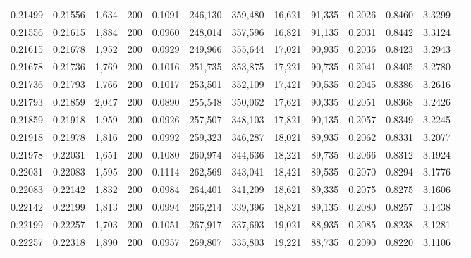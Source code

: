 \begin{tabular}{rrrrrrrrrrrrr}
0.21499 & 0.21556 & 1,634 & 200 &                                     0.1091 & 246,130 & 359,480 &  16,621 &  91,335 & 0.2026 & 0.8460 & 3.3299 \\
0.21556 & 0.21615 & 1,884 & 200 &                                     0.0960 & 248,014 & 357,596 &  16,821 &  91,135 & 0.2031 & 0.8442 & 3.3124 \\
0.21615 & 0.21678 & 1,952 & 200 &                                     0.0929 & 249,966 & 355,644 &  17,021 &  90,935 & 0.2036 & 0.8423 & 3.2943 \\
0.21678 & 0.21736 & 1,769 & 200 &                                     0.1016 & 251,735 & 353,875 &  17,221 &  90,735 & 0.2041 & 0.8405 & 3.2780 \\
0.21736 & 0.21793 & 1,766 & 200 &                                     0.1017 & 253,501 & 352,109 &  17,421 &  90,535 & 0.2045 & 0.8386 & 3.2616 \\
0.21793 & 0.21859 & 2,047 & 200 &                                     0.0890 & 255,548 & 350,062 &  17,621 &  90,335 & 0.2051 & 0.8368 & 3.2426 \\
0.21859 & 0.21918 & 1,959 & 200 &                                     0.0926 & 257,507 & 348,103 &  17,821 &  90,135 & 0.2057 & 0.8349 & 3.2245 \\
0.21918 & 0.21978 & 1,816 & 200 &                                     0.0992 & 259,323 & 346,287 &  18,021 &  89,935 & 0.2062 & 0.8331 & 3.2077 \\
0.21978 & 0.22031 & 1,651 & 200 &                                     0.1080 & 260,974 & 344,636 &  18,221 &  89,735 & 0.2066 & 0.8312 & 3.1924 \\
0.22031 & 0.22083 & 1,595 & 200 &                                     0.1114 & 262,569 & 343,041 &  18,421 &  89,535 & 0.2070 & 0.8294 & 3.1776 \\
0.22083 & 0.22142 & 1,832 & 200 &                                     0.0984 & 264,401 & 341,209 &  18,621 &  89,335 & 0.2075 & 0.8275 & 3.1606 \\
0.22142 & 0.22199 & 1,813 & 200 &                                     0.0994 & 266,214 & 339,396 &  18,821 &  89,135 & 0.2080 & 0.8257 & 3.1438 \\
0.22199 & 0.22257 & 1,703 & 200 &                                     0.1051 & 267,917 & 337,693 &  19,021 &  88,935 & 0.2085 & 0.8238 & 3.1281 \\
0.22257 & 0.22318 & 1,890 & 200 &                                     0.0957 & 269,807 & 335,803 &  19,221 &  88,735 & 0.2090 & 0.8220 & 3.1106 \\

\end{tabular}
